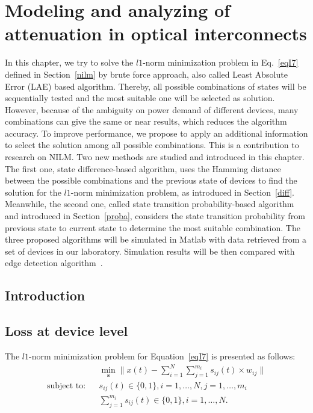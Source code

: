 
\chapter{Modeling and analyzing of attenuation in optical interconnects} %
\label{l1norm}

In this chapter, we try to solve the $l1$-norm minimization problem in Eq.~\eqref{eqI7} defined in Section~\ref{nilm} by brute force approach, also called Least Absolute Error (LAE) based algorithm. Thereby, all possible combinations of states will be sequentially tested and the most suitable one will be selected as solution. However, because of the ambiguity on power demand of different devices, many combinations can give the same or near results, which reduces the algorithm accuracy. To improve performance, we propose to apply an additional information to select the solution among all possible combinations. This is a contribution to research on NILM. Two new methods are studied and introduced in this chapter. The first one, state difference-based algorithm, uses the Hamming distance between the possible combinations and the previous state of devices to find the solution for the $l1$-norm minimization problem, as introduced in Section~\ref{diff}. Meanwhile, the second one, called state transition probability-based algorithm and introduced in Section~\ref{proba}, considers the state transition probability from previous state to current state to determine the most suitable combination. The three proposed algorithms will be simulated in Matlab with data retrieved from a set of devices in our laboratory. Simulation results will be then compared with edge detection algorithm~\cite{Hart92}.
\section{Introduction}\label{LAE}
\section{Loss at device level}\label{LAE}
The $l1$-norm minimization problem for Equation~\eqref{eqI7} is presented as follows:
\begin{eqnarray}\label{eqL1}
 &&\min_{\mathbf{s}}\parallel x(t)-\sum_{i=1}^{N}{\sum_{j=1}^{m_i}{s_{ij}(t)\times w_{ij}}}\parallel\\
\mbox{subject to:}&& s_{ij}(t)\in \{0,1\}, i=1,\ldots,N,j=1,\ldots,m_i\nonumber\\
&&\sum_{j=1}^{m_i}{s_{ij}(t)}\in \{0,1\}, i=1,\ldots,N. \nonumber
\end{eqnarray} 

